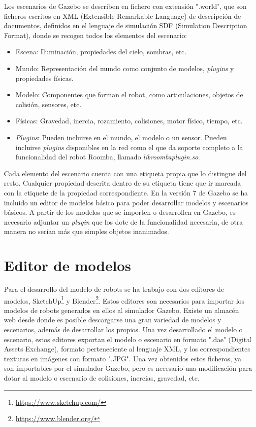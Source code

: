 Los escenarios de Gazebo se describen en fichero con extensión ".world", que son ficheros escritos en XML (Extensible Remarkable Language) de descripción de documentos, definidos en el lenguaje de simulación SDF (Simulation Description Format), donde se recogen todos los elementos del escenario:

\begin{itemize}
	\item Escena: Iluminación, propiedades del cielo, sombras, etc.
	\item Mundo: Representación del mundo como conjunto de modelos, \textit{plugins} y propiedades físicas.
	\item Modelo: Componentes que forman el robot, como articulaciones, objetos de colisión, sensores, etc.
	\item Físicas: Gravedad, inercia, rozamiento, colisiones, motor físico, tiempo, etc.
	\item \textit{Plugins}: Pueden incluirse en el mundo, el modelo o un sensor. Pueden incluirse \textit{plugins} disponibles en la red como el que da soporte completo a la funcionalidad del robot Roomba, llamado \textit{libroombaplugin.so}.
\end{itemize}

Cada elemento del escenario cuenta con una etiqueta propia que lo distingue del resto. Cualquier propiedad descrita dentro de su etiqueta tiene que ir marcada con la etiquete de la propiedad correspondiente.
En la versión 7 de Gazebo se ha incluido un editor de modelos básico para poder desarrollar modelos y escenarios básicos. A partir de los modelos que se importen o desarrollen en Gazebo, es necesario adjuntar un \textit{plugin} que los dote de la funcionalidad necesaria, de otra manera no serían más que simples objetos inanimados.

\section{Editor de modelos}
Para el desarrollo del modelo de robots se ha trabajo con dos editores de modelos, SketchUp\footnote{\url{https://www.sketchup.com/}} y Blender\footnote{\url{https://www.blender.org/}}. Estos editores son necesarios para importar los modelos de robots generados en ellos al simulador Gazebo.
Existe un almacén web desde donde es posible descargarse una gran variedad de modelos y escenarios, además de desarrollar los propios. Una vez desarrollado el modelo o escenario, estos editores exportan el modelo o escenario en formato ".dae" (Digital Assets Exchange), formato perteneciente al lenguaje XML, y los correspondientes texturas en imágenes con formato ".JPG". Una vez obtenidos estos ficheros, ya son importables por el simulador Gazebo, pero es necesario una modificación para dotar al modelo o escenario de colisiones, inercias, gravedad, etc. 

